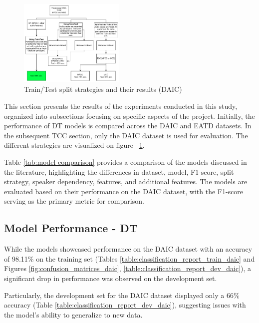 \begin{figure}[H]
    \centering
    \includegraphics[width=0.45\textwidth]{vis_pdf/Train Test problem.drawio.pdf}
    \caption{Train/Test split strategies and their results (DAIC)}
    \label{fig:train_test_split_problems}
\end{figure}

This section presents the results of the experiments conducted in this study, organized into subsections focusing on specific aspects of the project. Initially, the performance of DT models is compared across the DAIC and EATD datasets. In the subsequent TCC section, only the DAIC dataset is used for evaluation. The different strategies are visualized on figure ~\ref{fig:train_test_split_problems}.




Table \ref{tab:model-comparison} provides a comparison of the models discussed in the literature, highlighting the differences in dataset, model, F1-score, split strategy, speaker dependency, features, and additional features. The models are evaluated based on their performance on the DAIC dataset, with the F1-score serving as the primary metric for comparison.



\subsection{Model Performance - DT}
While the models showcased performance on the DAIC dataset with an accuracy of 98.11\% on the training set (Tables \ref{table:classification_report_train_daic} and Figures \ref{fig:confusion_matrices_daic}, \ref{table:classification_report_dev_daic}), a significant drop in performance was observed on the development set.

Particularly, the development set for the DAIC dataset displayed only a 66\% accuracy (Table \ref{table:classification_report_dev_daic}), suggesting issues with the model's ability to generalize to new data. 

